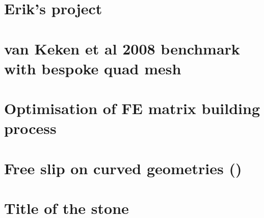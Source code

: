 \documentclass[a4paper,11pt]{report}
\begin{document}
\chapter{Erik's project \label{f148}} %

\chapter{van Keken et al 2008 benchmark with bespoke quad mesh\label{f149}} %

\chapter{Optimisation of FE matrix building process \label{f150}} %

\chapter{Free slip on curved geometries (\QtwoQone)\label{f151}} %




\chapter{Title of the stone}

\appendix
\end{document}
